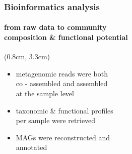 \documentclass{beamer}
\begin{document}
\begin{frame}
\begin{textblock*}{6cm}
      \end{textblock*}

   \end{frame}


   \begin{frame}
      \frametitle{Bioinformatics analysis}
      \framesubtitle{from raw data to community \\ composition \& functional potential}


      \begin{textblock*}{6cm}(0.8cm, 3.3cm)
         \small 

         \begin{itemize}

            \item metagenomic reads were both \\
            co - assembled and assembled \\
            at the sample level 
            \item taxonomic \& functional profiles \\
            per sample were retrieved \\ 
            \item MAGs were reconstructed and \\
            annotated


\end{itemize}
\end{textblock*}
\end{frame}
\end{document}
